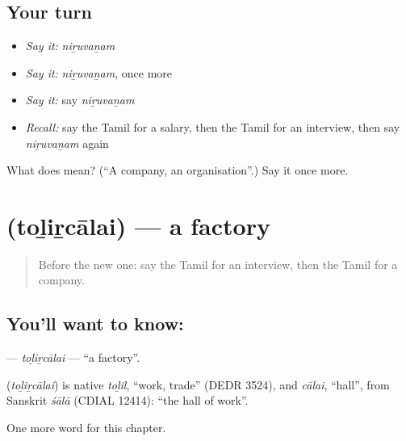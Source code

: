 \subsection*{Your turn}
\begin{itemize}
\raggedright
  \item \emph{Say it:} \emph{niṟuvaṉam}
  \item \emph{Say it:} \emph{niṟuvaṉam}, once more
  \item \emph{Say it:} say \emph{niṟuvaṉam}
  \item \emph{Recall:} say the Tamil for a salary, then the Tamil for an interview, then say \emph{niṟuvaṉam} again
\end{itemize}

\begin{tcolorbox}[breakable,colback=teal!4,colframe=teal!35!black,title={Before you move on}]
What does  mean? (\textquotedblleft{}A company, an organisation\textquotedblright{}.) Say it once more.
\end{tcolorbox}
\section[\texorpdfstring{\ta{தொழிற்சாலை} (toḻiṟcālai)}{தொழிற்சாலை (toḻiṟcālai)}]{ (toḻiṟcālai) — a factory}

\label{lesson:TA-C223-tolircalai}



\begin{quote}
Before the new one: say the Tamil for an interview, then the Tamil for a company.
\end{quote}

\subsection*{You'll want to know: }
\textbf{} — \emph{toḻiṟcālai} — \textquotedblleft{}a factory\textquotedblright{}.

\begin{cousinweb}
\textbf{} (\emph{toḻiṟcālai}) is native \emph{toḻil}, \textquotedblleft{}work, trade\textquotedblright{} (DEDR 3524), and \emph{cālai}, \textquotedblleft{}hall\textquotedblright{}, from Sanskrit \emph{śālā} (CDIAL 12414): \textquotedblleft{}the hall of work\textquotedblright{}.
\end{cousinweb}

\begin{grammarlens}[title={What you've built}]
One more word for this chapter.
\end{grammarlens}

